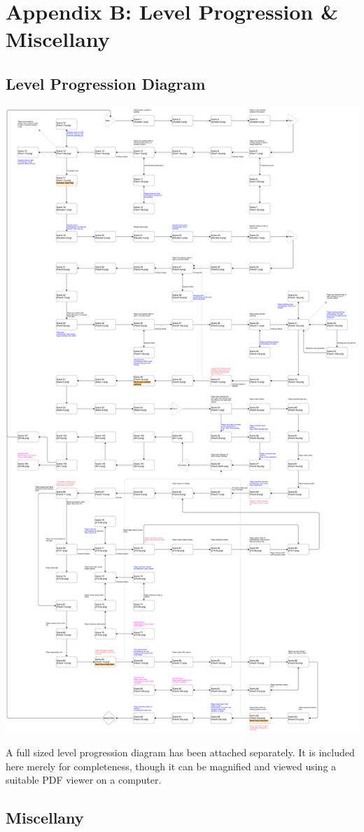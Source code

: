 \documentclass{article}
\begin{document}
\section{Appendix B: Level Progression \& Miscellany}
	\subsection{Level Progression Diagram}
		\begin{center}
			\includegraphics[scale=0.15]{LevelProgression.pdf}
		\end{center}
		A full sized level progression diagram has been attached separately. It is included here merely for completeness, though it can be magnified and viewed using a suitable PDF viewer on a computer. 
	\subsection{Miscellany} 

\end{document}
